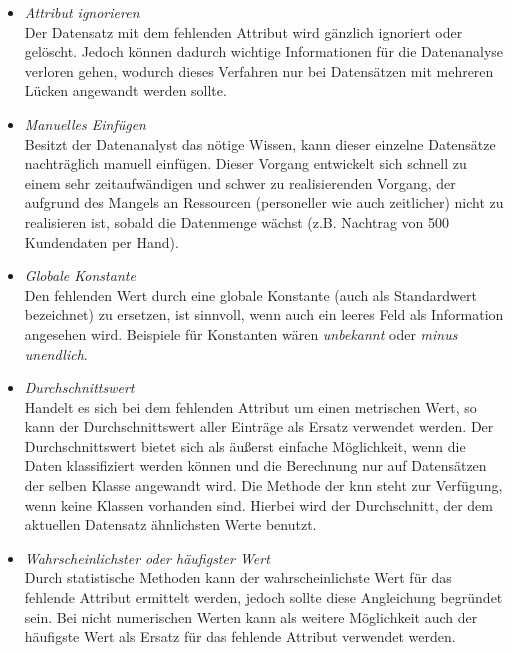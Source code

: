 \begin{itemize}
\item \textit{Attribut ignorieren}
\\ Der Datensatz mit dem fehlenden Attribut wird gänzlich ignoriert oder gelöscht. Jedoch können dadurch wichtige Informationen für die Datenanalyse verloren gehen, wodurch dieses Verfahren nur bei Datensätzen mit mehreren Lücken angewandt werden sollte.

\item \textit{Manuelles Einfügen}
\\ Besitzt der Datenanalyst das nötige Wissen, kann dieser einzelne Datensätze nachträglich manuell einfügen. Dieser Vorgang entwickelt sich schnell zu einem sehr zeitaufwändigen und schwer zu realisierenden Vorgang, der aufgrund des Mangels an Ressourcen (personeller wie auch zeitlicher) nicht zu realisieren ist, sobald die Datenmenge wächst (z.B. Nachtrag von 500 Kundendaten per Hand).

\item \textit{Globale Konstante}
\\ Den fehlenden Wert durch eine globale Konstante (auch als Standardwert bezeichnet) zu ersetzen, ist sinnvoll, wenn auch ein leeres Feld als Information angesehen wird. Beispiele für Konstanten wären \textit{unbekannt} oder \textit{minus unendlich}.

\item \textit{Durchschnittswert}
\\ Handelt es sich bei dem fehlenden Attribut um einen metrischen Wert, so kann der Durchschnittswert aller Einträge als Ersatz verwendet werden. Der Durchschnittswert bietet sich als äußerst einfache Möglichkeit, wenn die Daten klassifiziert werden können und die Berechnung nur auf Datensätzen der selben Klasse angewandt wird. Die Methode der \gls{knn} steht zur Verfügung, wenn keine Klassen vorhanden sind. Hierbei wird der Durchschnitt, der dem aktuellen Datensatz ähnlichsten Werte benutzt.

\item \textit{Wahrscheinlichster oder häufigster Wert}
\\ Durch statistische Methoden kann der wahrscheinlichste Wert für das fehlende Attribut ermittelt werden, jedoch sollte diese Angleichung begründet sein. Bei nicht numerischen Werten kann als weitere Möglichkeit auch der häufigste Wert als Ersatz für das fehlende Attribut verwendet werden.
\end{itemize}

